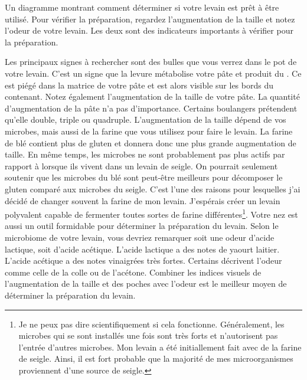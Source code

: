 \begin{flowchart}[!htb]
\begin{center}
  
  \caption[Préparation du levain]{Un diagramme montrant comment
      déterminer si votre levain est prêt à être utilisé. Pour vérifier
      la préparation, regardez l'augmentation de la taille et notez l'odeur de votre levain.
      Les deux sont des indicateurs importants à vérifier pour la préparation.}%
  \label{fig:sourdough-starter-readiness}
\end{center}
\end{flowchart}Les principaux signes à rechercher sont des bulles que vous verrez dans le pot de votre levain. C'est un signe que la levure métabolise votre pâte et produit du . Ce  est piégé dans la matrice de votre pâte et est alors visible sur les bords du contenant. Notez également l'augmentation de la taille de votre pâte. La quantité d'augmentation de la pâte n'a pas d'importance. Certains boulangers prétendent qu'elle double, triple ou quadruple. L'augmentation de la taille dépend de vos microbes, mais aussi de la farine que vous utilisez pour faire le levain. La farine de blé contient plus de gluten et donnera donc une plus grande augmentation de taille. En même temps, les microbes ne sont probablement pas plus actifs par rapport à lorsque ils vivent dans un levain de seigle. On pourrait seulement soutenir que les microbes du blé sont peut-être meilleurs pour décomposer le gluten comparé aux microbes du seigle. C'est l'une des raisons pour lesquelles j'ai décidé de changer souvent la farine de mon levain. J'espérais créer un levain polyvalent capable de fermenter toutes sortes de farine différentes\footnote{Je ne peux pas dire scientifiquement si cela fonctionne. Généralement, les microbes qui se sont installés une fois sont très forts et n'autorisent pas l'entrée d'autres microbes. Mon levain a été initiallement fait avec de la farine de seigle. Ainsi, il est fort probable que la majorité de mes microorganismes proviennent d'une source de seigle.}. Votre nez est aussi un outil formidable pour déterminer la préparation du levain. Selon le microbiome de votre levain, vous devriez remarquer soit une odeur d'acide lactique, soit d'acide acétique. L'acide lactique a des notes de yaourt laitier. L'acide acétique a des notes vinaigrées très fortes. Certains décrivent l'odeur comme celle de la colle ou de l'acétone. Combiner les indices visuels de l'augmentation de la taille et des poches avec l'odeur est le meilleur moyen de déterminer la préparation du levain.

